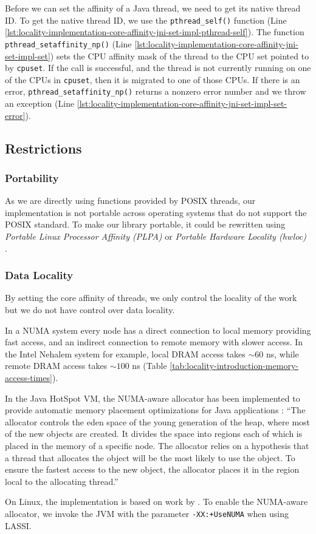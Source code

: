 Before we can set the affinity of a Java thread, we need to get its
native thread ID. To get the native thread ID, we use the
\lstinline!pthread_self()! function (Line
\ref{lst:locality-implementation-core-affinity-jni-set-impl-pthread-self}). The
function \lstinline!pthread_setaffinity_np()! (Line
\ref{lst:locality-implementation-core-affinity-jni-set-impl-set}) sets
the CPU affinity mask of the thread to the CPU set pointed to by
\lstinline!cpuset!.  If the call is successful, and the thread is not
currently running on one of the CPUs in \lstinline!cpuset!, then it is
migrated to one of those CPUs. If there is an error,
\lstinline!pthread_setaffinity_np()!  returns a nonzero error number
and we throw an exception (Line
\ref{lst:locality-implementation-core-affinity-jni-set-impl-set-error}).

\subsection{Restrictions}
\label{sec:locality-implementation-core-affinity-restrictions}

\subsubsection{Portability}

As we are directly using functions provided by POSIX threads, our
implementation is not portable across operating systems that do not
support the POSIX standard. To make our library portable, it could be
rewritten using \emph{Portable Linux Processor Affinity (PLPA)}
\cite{OpenMPI2010a} or \emph{Portable Hardware Locality (hwloc)}
\cite{OpenMPI2010}.

\subsubsection{Data Locality}

By setting the core affinity of threads, we only control the locality
of the work but we do not have control over data locality.

In a NUMA system every node has a direct connection to local memory
providing fast access, and an indirect connection to remote memory
with slower access. In the Intel Nehalem system for example, local
DRAM access takes $\sim 60$ ns, while remote DRAM access takes $\sim
100$ ns (Table \ref{tab:locality-introduction-memory-access-times}).

In the Java HotSpot VM, the NUMA-aware allocator has been implemented
to provide automatic memory placement optimizations for Java
applications \cite{Masamitsu2008, Oracle2010, Humble2010}: ``The
allocator controls the eden space of the young generation of the heap,
where most of the new objects are created. It divides the space into
regions each of which is placed in the memory of a specific node. The
allocator relies on a hypothesis that a thread that allocates the
object will be the most likely to use the object. To ensure the
fastest access to the new object, the allocator places it in the
region local to the allocating thread.''

On Linux, the implementation is based on work by
\textcite{Kleen2004}. To enable the NUMA-aware allocator, we invoke
the JVM with the parameter \verb!-XX:+UseNUMA! when using LASSI.


